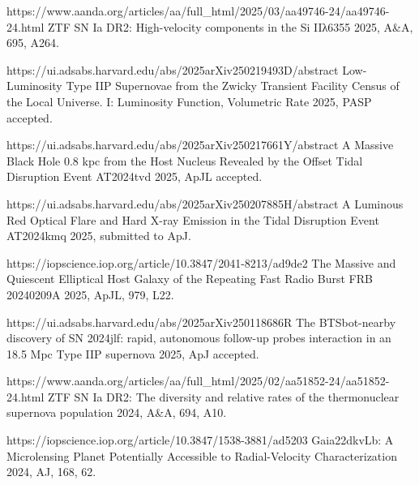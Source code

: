 \begin{cvpubs}
{\begin{cvitems}
    \item {}
    {\Cliu}
    {https://www.aanda.org/articles/aa/full_html/2025/03/aa49746-24/aa49746-24.html}
    {ZTF SN Ia DR2: High-velocity components in the Si IIλ6355}
    {2025, A\&A, 695, A264.}
    \item {}
    {\Cliu}
    {https://ui.adsabs.harvard.edu/abs/2025arXiv250219493D/abstract}
    {Low-Luminosity Type IIP Supernovae from the Zwicky Transient Facility Census of the Local Universe. I: Luminosity Function, Volumetric Rate}
    {2025, PASP accepted.}
    \item {}
    {\Cliu}
    {https://ui.adsabs.harvard.edu/abs/2025arXiv250217661Y/abstract}
    {A Massive Black Hole 0.8 kpc from the Host Nucleus Revealed by the Offset Tidal Disruption Event AT2024tvd}
    {2025, ApJL accepted.}
    \item {}
    {\Cliu}
    {https://ui.adsabs.harvard.edu/abs/2025arXiv250207885H/abstract}
    {A Luminous Red Optical Flare and Hard X-ray Emission in the Tidal Disruption Event AT2024kmq}
    {2025, submitted to ApJ.}
    \item {}
    {\Cliu}
    {https://iopscience.iop.org/article/10.3847/2041-8213/ad9de2}
    {The Massive and Quiescent Elliptical Host Galaxy of the Repeating Fast Radio Burst FRB 20240209A}
    {2025, ApJL, 979, L22.}
\end{cvitems}
}
\cvpub
{
\begin{cvitems}
    \item {} 
    {\Cliu}
    {https://ui.adsabs.harvard.edu/abs/2025arXiv250118686R}
    {The BTSbot-nearby discovery of SN 2024jlf: rapid, autonomous follow-up probes interaction in an 18.5 Mpc Type IIP supernova}
    {2025, ApJ accepted.}
    \item {}
    {\Cliu}
    {https://www.aanda.org/articles/aa/full_html/2025/02/aa51852-24/aa51852-24.html}
    {ZTF SN Ia DR2: The diversity and relative rates of the thermonuclear supernova population}
    {2024, A\&A, 694, A10.}
    \item {} 
    {\Cliu}
    {https://iopscience.iop.org/article/10.3847/1538-3881/ad5203}
    {Gaia22dkvLb: A Microlensing Planet Potentially Accessible to Radial-Velocity Characterization}
    {2024, AJ, 168, 62.}
    \item {} 

\end{cvitems}}
\end{cvpubs}
